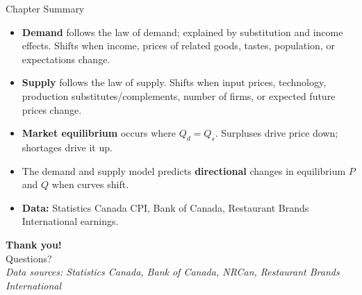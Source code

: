 \documentclass[aspectratio=169]{beamer}
\begin{document}
\begin{frame}{Chapter Summary}
\transfade
\begin{itemize}[<+->]
  \item \textbf{Demand} follows the law of demand; explained by substitution and income effects. Shifts when income, prices of related goods, tastes, population, or expectations change.
  \item \textbf{Supply} follows the law of supply. Shifts when input prices, technology, production substitutes/complements, number of firms, or expected future prices change.
  \item \textbf{Market equilibrium} occurs where $Q_d = Q_s$. Surpluses drive price down; shortages drive it up.
  \item The demand and supply model predicts \textbf{directional} changes in equilibrium $P$ and $Q$ when curves shift.
  \item \textbf{Data:} Statistics Canada CPI, Bank of Canada, Restaurant Brands International earnings.
\end{itemize}
\end{frame}

\begin{frame}
\centering
\Huge \textbf{Thank you!}\\[1em]
\normalsize Questions?\\[0.5em]
\small \textit{Data sources: Statistics Canada, Bank of Canada, NRCan, Restaurant Brands International}
\end{frame}
\end{document}

